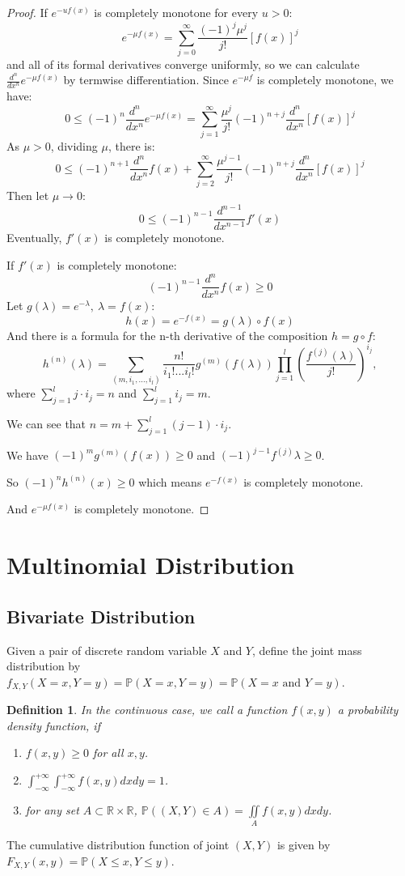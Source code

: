 \documentclass[11pt]{article}
\def\BP{{\bf P}}
\def\BR{{\mathbb R}}
\def\BP{{\mathbb P}}
\newtheorem{definition}{Definition}[section]
\begin{document}
\begin{proof}
If $e^{-uf(x)}$ is completely monotone for every $u>0$:
\[e^{-\mu f(x)} = \sum_{j=0}^{\infty}\frac{(-1)^j\mu^j}{j!}[f(x)]^j\] and all of its formal derivatives converge uniformly, so we can calculate $\frac{d^n}{dx^n}e^{-\mu f(x)}$ by termwise differentiation.
Since $e^{-\mu f}$ is completely monotone, we have:
\[0\le(-1)^n\frac{d^n}{dx^n}e^{-\mu f(x)} = \sum_{j=1}^{\infty}\frac{\mu^j}{j!}(-1)^{n+j}\frac{d^n}{dx^n}[f(x)]^j\]
As $\mu > 0$, dividing $\mu$, there is:
\[0\le(-1)^{n+1}\frac{d^n}{dx^n}f(x)+\sum_{j=2}^{\infty}\frac{\mu^{j-1}}{j!}(-1)^{n+j}\frac{d^n}{dx^n}[f(x)]^j\]
Then let $\mu \rightarrow 0$:
\[0\le(-1)^{n-1}\frac{d^{n-1}}{dx^{n-1}}f'(x)\]
Eventually, $f'(x)$ is completely monotone.

If $f'(x)$ is completely monotone:
\[(-1)^{n-1}\frac{d^n}{dx^n}f(x)\ge0\]
Let $g(\lambda) = e^{-\lambda},~ \lambda = f(x)$:
\[h(x) = e^{- f(x)} = g(\lambda)\circ f(x)\]
And there is a formula for the n-th derivative of the composition $h = g\circ f$:
\[h^{(n)}(\lambda) = \sum_{(m,i_1,...,i_l)}^{}\frac{n!}{i_1!...i_l!}g^{(m)}(f(\lambda))\prod_{j=1}^{l}(\frac{f^{(j)}(\lambda)}{j!})^{i_j},\]
where $\sum_{j=1}^{l}j\cdot i_j = n$ and $\sum_{j=1}^{l}i_j = m$.

We can see that $n = m + \sum_{j=1}^{l}(j-1)\cdot i_j$.

We have $(-1)^mg^{(m)}(f(x)) \ge 0$ and $(-1)^{j-1}f^{(j)}\lambda \ge 0$. 

So $(-1)^nh^{(n)}(x) \ge 0$ which means $e^{-f(x)}$ is completely monotone.

And $e^{-\mu f(x)}$ is completely monotone.


\end{proof}

\setcounter{section}{3}
\section{Multinomial Distribution}

\subsection{Bivariate Distribution}
Given a pair of discrete random variable $X$ and $Y$, define the joint mass distribution by $f_{X,Y}(X=x, Y=y) = \BP(X=x, Y=y) = \BP(X=x \text{ and } Y = y)$.

\begin{definition}
In the continuous case, we call a function $f(x,y)$ a probability density function, if
\begin{enumerate}
\item $f(x,y) \geq 0$ for all $x, y$.
\item $\int_{-\infty}^{+\infty}\int_{-\infty}^{+\infty} f(x,y) dxdy = 1$.
\item for any set $A \subset \BR \times \BR$, $\BP((X,Y) \in A) = \iint\limits_A f(x,y) dxdy$. 
\end{enumerate}
\end{definition}
The cumulative distribution function of joint $(X,Y)$ is given by $F_{X,Y} (x, y) = \BP(X \leq x, Y \leq y)$.
\end{document}
